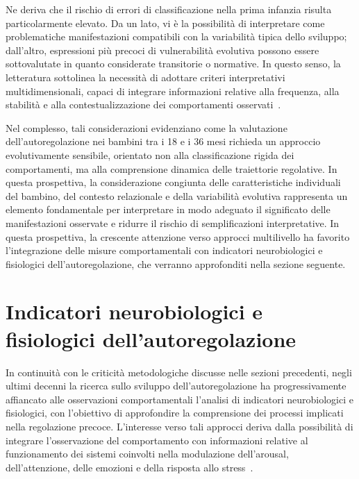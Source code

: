             Ne deriva che il rischio di errori di classificazione nella prima infanzia risulta particolarmente elevato. Da un lato, vi è la possibilità di interpretare come problematiche manifestazioni compatibili con la variabilità tipica dello sviluppo; dall'altro, espressioni più precoci di vulnerabilità evolutiva possono essere sottovalutate in quanto considerate transitorie o normative. In questo senso, la letteratura sottolinea la necessità di adottare criteri interpretativi multidimensionali, capaci di integrare informazioni relative alla frequenza, alla stabilità e alla contestualizzazione dei comportamenti osservati~\cite{calkins2007,egger2006}.

            Nel complesso, tali considerazioni evidenziano come la valutazione dell'autoregolazione nei bambini tra i 18 e i 36 mesi richieda un approccio evolutivamente sensibile, orientato non alla classificazione rigida dei comportamenti, ma alla comprensione dinamica delle traiettorie regolative. In questa prospettiva, la considerazione congiunta delle caratteristiche individuali del bambino, del contesto relazionale e della variabilità evolutiva rappresenta un elemento fondamentale per interpretare in modo adeguato il significato delle manifestazioni osservate e ridurre il rischio di semplificazioni interpretative. In questa prospettiva, la crescente attenzione verso approcci multilivello ha favorito l'integrazione delle misure comportamentali con indicatori neurobiologici e fisiologici dell'autoregolazione, che verranno approfonditi nella sezione seguente.

    \section{Indicatori neurobiologici e fisiologici dell'autoregolazione}
    \label{sec:3_3}

        In continuità con le criticità metodologiche discusse nelle sezioni precedenti, negli ultimi decenni la ricerca sullo sviluppo dell'autoregolazione ha progressivamente affiancato alle osservazioni comportamentali l'analisi di indicatori neurobiologici e fisiologici, con l'obiettivo di approfondire la comprensione dei processi implicati nella regolazione precoce. L'interesse verso tali approcci deriva dalla possibilità di integrare l'osservazione del comportamento con informazioni relative al funzionamento dei sistemi coinvolti nella modulazione dell'arousal, dell'attenzione, delle emozioni e della risposta allo stress~\cite{blair2015,beauchaine2019}.

